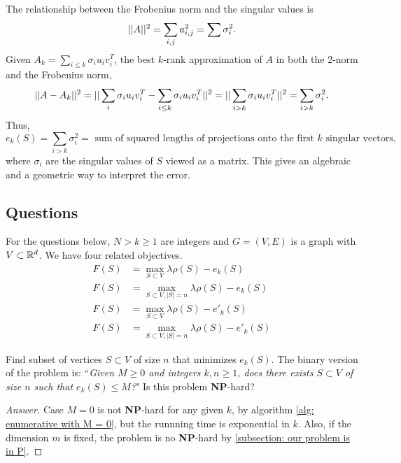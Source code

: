 \documentclass{article}
\begin{document}
The relationship between the Frobenius norm and the singular values is
$$||A||^2 = \sum_{i,j}a_{i,j}^2 = \sum \sigma_i^2.$$
Given $A_k = \sum_{i\leq k}\sigma_i u_i v_i^T$, the best $k$-rank approximation of $A$ in both the 2-norm and the Frobenius norm,
$$||A - A_k||^2 = ||\sum_{i}\sigma_i u_i v_i^T - \sum_{i\leq k}\sigma_i u_i v_i^T||^2 = ||\sum_{i > k}\sigma_i u_i v_i^T||^2 = \sum_{i>k}\sigma_i^2.$$
Thus, $$e_k(S) = \sum_{i>k}\sigma_i^2 = \text{ sum of squared lengths of projections onto the first $k$ singular vectors},$$ where $\sigma_i$ are the singular values of $S$ viewed as a matrix. This gives an algebraic and a geometric way to interpret the error.

\subsection{Questions}
For the questions below, $N > k \geq 1$ are integers and $G = (V,E)$ is a graph with $V\subset \mathbb{R}^d$. We have four related objectives.
\begin{align}
    F(S) &= \max_{S \subset V} \lambda \rho(S) - e_k(S)\label{eqn: n not given, not normalized}\\
    F(S) &= \max_{S \subset V, |S| = n} \lambda \rho(S) - e_k(S)\label{eqn: n given, not normalized}\\
    F(S) &= \max_{S \subset V} \lambda \rho(S) - e'_k(S)\label{eqn: n not given, normalized}\\
    F(S) &= \max_{S \subset V, |S| = n} \lambda \rho(S) - e'_k(S)\label{eqn: n given, normalized}
\end{align}

\begin{question}\label{problem: no density}
    Find subset of vertices $S\subset V$ of size $n$ that minimizes $e_k(S)$. The binary version of the problem is: ``\textit{Given $M \geq 0$ and integers $k,n\geq 1$, does there exists  $S\subset V$ of size $n$ such that $e_k(S)\leq M$?}" Is this problem \textbf{NP}-hard?
\end{question}

\begin{proof}[Answer]
Case $M=0$ is not \textbf{NP}-hard for any given $k$, by algorithm \ref{alg: enumerative with M = 0}, but the runnning time is exponential in $k$. Also, if the dimension $m$ is fixed, the problem is no \textbf{NP}-hard by \ref{subsection: our problem is in P}.
\end{proof}
\end{document}
